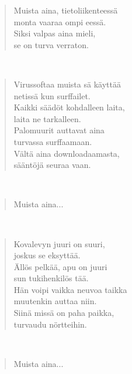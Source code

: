 \noindent\begin{minipage}{\linewidth}
\begin{verse}
	Muista aina, tietoliikenteessä\\
	monta vaaraa ompi eessä.\\
	Siksi valpas aina mieli,\\
	se on turva verraton.\\
\end{verse}
\end{minipage}\\[10pt]
\noindent\begin{minipage}{\linewidth}
\begin{verse}
	Virussoftaa muista sä käyttää\\
	netissä kun surffailet.\\
	Kaikki säädöt kohdalleen laita,\\
	laita ne tarkalleen.\\
	Palomuurit auttavat aina\\
	turvassa surffaamaan.\\
	Vältä aina downloadaamasta,\\
	sääntöjä seuraa vaan.\\
\end{verse}
\end{minipage}\\[10pt]
\noindent\begin{minipage}{\linewidth}
\begin{verse}
	Muista aina...\\
\end{verse}
\end{minipage}\\[10pt]
\noindent\begin{minipage}{\linewidth}
\begin{verse}
	Kovalevyn juuri on suuri,\\
	joskus se eksyttää.\\
	Ällös pelkää, apu on juuri\\
	sun tukihenkilös tää.\\
	Hän voipi vaikka neuvoa taikka\\
	muutenkin auttaa niin.\\
	Siinä missä on paha paikka,\\
	turvaudu nörtteihin.\\
\end{verse}
\end{minipage}\\[10pt]
\noindent\begin{minipage}{\linewidth}
\begin{verse}
	Muista aina...\\
\end{verse}
\end{minipage}\\[10pt]
